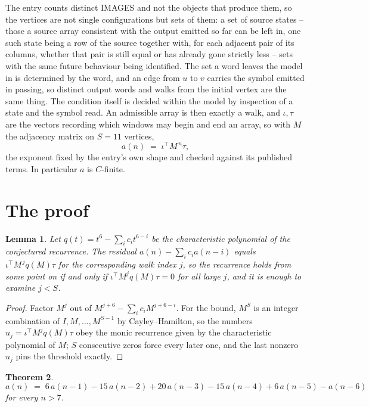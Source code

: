 \documentclass[11pt,a4paper]{article}
\theoremstyle{plain}
\newtheorem{theorem}{Theorem}
\newtheorem{lemma}[theorem]{Lemma}
\theoremstyle{definition}
\begin{document}
The entry counts distinct IMAGES and not the objects that produce them, so the vertices are not single configurations but sets of them: a set of source states -- those a source array consistent with the output emitted so far can be left in, one such state being a row of the source together with, for each adjacent pair of its columns, whether that pair is still equal or has already gone strictly less -- sets with the same future behaviour being identified. The set a word leaves the model in is determined by the word, and an edge from $u$ to $v$ carries the symbol emitted in passing, so distinct output words and walks from the initial vertex are the same thing. The condition itself is decided within the model by inspection of a state and the symbol read.
An admissible array is then exactly a walk, and $\iota,\tau$ are the vectors recording which windows may begin and end an array, so with $M$ the adjacency matrix on $S=11$ vertices,
\[
a(n)\;=\;\iota^{\!\top}M^{\,n}\tau ,
\]
the exponent fixed by the entry's own shape and checked against its published terms. In
particular $a$ is $C$-finite.

\section{The proof}

\begin{lemma}\label{lem:crit}
Let $q(t)=t^{6}-\sum_i c_it^{6-i}$ be the characteristic polynomial of the
conjectured recurrence. The residual $a(n)-\sum_ic_ia(n-i)$ equals
$\iota^{\!\top}M^{\,j}q(M)\tau$ for the corresponding walk index $j$, so the recurrence
holds from some point on if and only if $\iota^{\!\top}M^{j}q(M)\tau=0$ for all large $j$,
and it is enough to examine $j<S$.
\end{lemma}

\begin{proof}
Factor $M^{j}$ out of $M^{j+6}-\sum_ic_iM^{j+6-i}$. For the bound, $M^{S}$
is an integer combination of $I,M,\dots,M^{S-1}$ by Cayley--Hamilton, so the numbers
$u_j=\iota^{\!\top}M^{j}q(M)\tau$ obey the monic recurrence given by the characteristic
polynomial of $M$; $S$ consecutive zeros force every later one, and the last nonzero $u_j$
pins the threshold exactly.
\end{proof}

\begin{theorem}
\[
a(n)\;=\;6\,a(n-1) - 15\,a(n-2) + 20\,a(n-3) - 15\,a(n-4) + 6\,a(n-5) - a(n-6)
\]
for every $n>7$.
\end{theorem}
\end{document}
